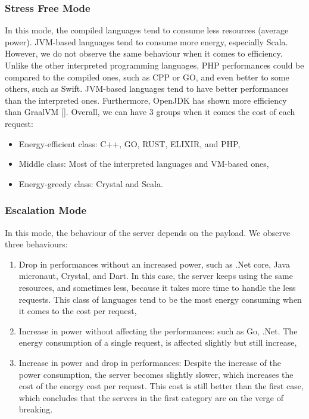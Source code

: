 \subsubsection{Stress Free Mode}
In this mode, the compiled languages tend to consume less resources (average power).
JVM-based languages tend to consume more energy, especially Scala.
However, we do not observe the same behaviour when it comes to efficiency.
Unlike the other interpreted programming languages, PHP performances could be compared to the compiled ones, such as CPP or GO, and even better to some others, such as Swift.
JVM-based languages tend to have better performances than the interpreted ones.
Furthermore, OpenJDK has shown more efficiency than GraalVM [].
Overall, we can have 3 groups when it comes the cost of each request:
\begin{itemize}
    \item Energy-efficient class: C++, GO, RUST, ELIXIR, and PHP,
    \item Middle class: Most of the interpreted languages and VM-based ones,
    \item Energy-greedy class: Crystal and Scala.
\end{itemize}

\subsubsection{Escalation Mode}
In this mode, the behaviour of the server depends on the payload. We observe three behaviours:
\begin{enumerate}
    \item Drop in performances without an increased power, such as .Net core, Java micronaut, Crystal, and Dart.
          In this case, the server keeps using the same resources, and sometimes less, because it takes more time to handle the less requests.
          This class of languages tend to be the most energy consuming when it comes to the cost per request,
    \item Increase in power without affecting the performances: such as Go, .Net.
          The energy consumption of a single request, is affected slightly but still increase,
    \item Increase in power and drop in performances: Despite the increase of the power consumption, the server becomes slightly slower, which increases the cost of the energy cost per request.
          This cost is still better than the first case, which concludes that the servers in the first category are on the verge of breaking.
\end{enumerate}

